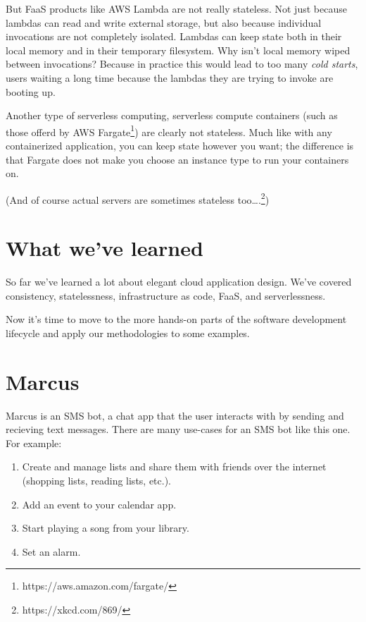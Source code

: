 \documentclass{article}
\newcommand{\noterm}[1]{\textit{#1}}
\newcommand{\term}[1]{\noterm{#1}\index{#1}}
\begin{document}
But FaaS products like AWS Lambda are not really stateless.
Not just because lambdas can read and write external storage, but also because individual invocations are not completely isolated.
Lambdas can keep state both in their local memory and in their temporary filesystem.
Why isn't local memory wiped between invocations?
Because in practice this would lead to too many \term{cold starts}, users waiting a long time because the lambdas they are trying to invoke are booting up.

Another type of serverless computing, serverless compute containers (such as those offerd by AWS Fargate\footnote{https://aws.amazon.com/fargate/}) are clearly not stateless.
Much like with any containerized application, you can keep state however you want; the difference is that Fargate does not make you choose an instance type to run your containers on.

(And of course actual servers are sometimes stateless too\ldots.\footnote{https://xkcd.com/869/})

\section{What we've learned}

So far we've learned a lot about elegant cloud application design.
We've covered consistency, statelessness, infrastructure as code, FaaS, and serverlessness.

Now it's time to move to the more hands-on parts of the software development lifecycle and apply our methodologies to some examples.

\section{Marcus}

Marcus is an SMS bot, a chat app that the user interacts with by sending and recieving text messages.
There are many use-cases for an SMS bot like this one.
For example:

\begin{enumerate}
  \item Create and manage lists and share them with friends over the internet (shopping lists, reading lists, etc.).
  \item Add an event to your calendar app.
  \item Start playing a song from your library.
  \item Set an alarm.
\end{enumerate}
\end{document}
